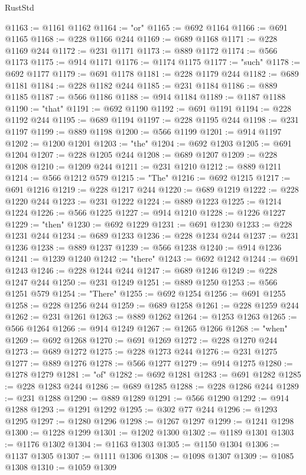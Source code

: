 \begin{lexlean}{RustStd}
\begin{coremodule}
@1163 := @1161 @1162
@1164 := "or"
@1165 := @692 @1164
@1166 := @691 @1165
@1168 := @228 @1166 @244
@1169 := @689 @1168
@1171 := @228 @1169 @244
@1172 := @231 @1171
@1173 := @889 @1172
@1174 := @566 @1173
@1175 := @914 @1171
@1176 := @1174 @1175
@1177 := "such"
@1178 := @692 @1177
@1179 := @691 @1178
@1181 := @228 @1179 @244
@1182 := @689 @1181
@1184 := @228 @1182 @244
@1185 := @231 @1184
@1186 := @889 @1185
@1187 := @566 @1186
@1188 := @914 @1184
@1189 := @1187 @1188
@1190 := "that"
@1191 := @692 @1190
@1192 := @691 @1191
@1194 := @228 @1192 @244
@1195 := @689 @1194
@1197 := @228 @1195 @244
@1198 := @231 @1197
@1199 := @889 @1198
@1200 := @566 @1199
@1201 := @914 @1197
@1202 := @1200 @1201
@1203 := "the"
@1204 := @692 @1203
@1205 := @691 @1204
@1207 := @228 @1205 @244
@1208 := @689 @1207
@1209 := @228 @1208
@1210 := @1209 @244
@1211 := @231 @1210
@1212 := @889 @1211
@1214 := @566 @1212 @579
@1215 := "The"
@1216 := @692 @1215
@1217 := @691 @1216
@1219 := @228 @1217 @244
@1220 := @689 @1219
@1222 := @228 @1220 @244
@1223 := @231 @1222
@1224 := @889 @1223
@1225 := @1214 @1224
@1226 := @566 @1225
@1227 := @914 @1210
@1228 := @1226 @1227
@1229 := "then"
@1230 := @692 @1229
@1231 := @691 @1230
@1233 := @228 @1231 @244
@1234 := @689 @1233
@1236 := @228 @1234 @244
@1237 := @231 @1236
@1238 := @889 @1237
@1239 := @566 @1238
@1240 := @914 @1236
@1241 := @1239 @1240
@1242 := "there"
@1243 := @692 @1242
@1244 := @691 @1243
@1246 := @228 @1244 @244
@1247 := @689 @1246
@1249 := @228 @1247 @244
@1250 := @231 @1249
@1251 := @889 @1250
@1253 := @566 @1251 @579
@1254 := "There"
@1255 := @692 @1254
@1256 := @691 @1255
@1258 := @228 @1256 @244
@1259 := @689 @1258
@1261 := @228 @1259 @244
@1262 := @231 @1261
@1263 := @889 @1262
@1264 := @1253 @1263
@1265 := @566 @1264
@1266 := @914 @1249
@1267 := @1265 @1266
@1268 := "when"
@1269 := @692 @1268
@1270 := @691 @1269
@1272 := @228 @1270 @244
@1273 := @689 @1272
@1275 := @228 @1273 @244
@1276 := @231 @1275
@1277 := @889 @1276
@1278 := @566 @1277
@1279 := @914 @1275
@1280 := @1278 @1279
@1281 := "of"
@1282 := @692 @1281
@1283 := @691 @1282
@1285 := @228 @1283 @244
@1286 := @689 @1285
@1288 := @228 @1286 @244
@1289 := @231 @1288
@1290 := @889 @1289
@1291 := @566 @1290
@1292 := @914 @1288
@1293 := @1291 @1292
@1295 := @302 @77 @244
@1296 := @1293 @1295
@1297 := @1280 @1296
@1298 := @1267 @1297
@1299 := @1241 @1298
@1300 := @1228 @1299
@1301 := @1202 @1300
@1302 := @1189 @1301
@1303 := @1176 @1302
@1304 := @1163 @1303
@1305 := @1150 @1304
@1306 := @1137 @1305
@1307 := @1111 @1306
@1308 := @1098 @1307
@1309 := @1085 @1308
@1310 := @1059 @1309

\end{coremodule}
\end{lexlean}
